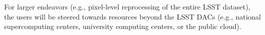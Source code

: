 \documentclass[DM,lsstdraft,toc]{lsstdoc}
\begin{document}
For larger endeavors (e.g., pixel-level reprocessing of the entire LSST
dataset), the users will be steered towards resources beyond the LSST DACs
(e.g., national supercomputing centers, university computing centers, or the
public cloud).



\end{document}
